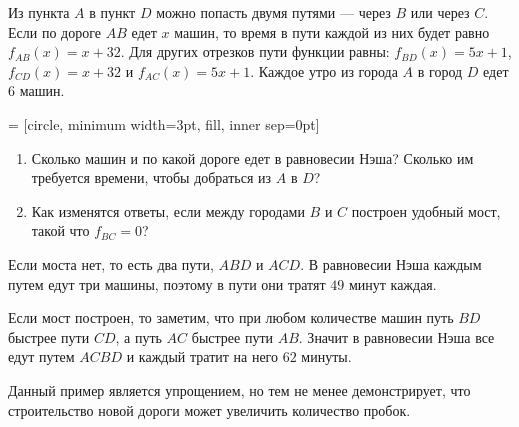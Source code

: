 \begin{problem}
Из пункта $A$ в пункт $D$ можно попасть двумя путями --- через $B$ или
через $C$. Если по дороге $AB$ едет $x$ машин, то время в пути каждой
из них будет равно $f_{AB}(x)=x+32$. Для других отрезков пути
функции равны: $f_{BD}(x)=5x+1$, $f_{CD}(x)=x+32$ и
$f_{AC}(x)=5x+1$.
Каждое утро из города $A$ в город $D$ едет 6 машин.

 = [circle, minimum width=3pt, fill, inner sep=0pt]



\begin{enumerate}
\item Сколько машин и по какой дороге едет в равновесии  Нэша?
Сколько им требуется времени, чтобы добраться из $A$ в $D$?
\item  Как изменятся ответы, если между городами $B$ и $C$ построен удобный мост, такой что $f_{BC}=0$?
\end{enumerate}


\begin{sol}
Если моста нет, то есть два пути, $ABD$ и $ACD$. В равновесии Нэша каждым путем едут три машины, поэтому в пути они тратят $49$ минут каждая.

Если мост построен, то заметим, что при любом количестве машин путь $BD$ быстрее пути $CD$, а путь $AC$ быстрее пути $AB$. Значит в равновесии Нэша все едут путем $ACBD$ и каждый тратит на него $62$ минуты.

Данный пример является упрощением, но тем не менее демонстрирует, что строительство новой дороги может увеличить количество пробок.
\end{sol}
\end{problem}


